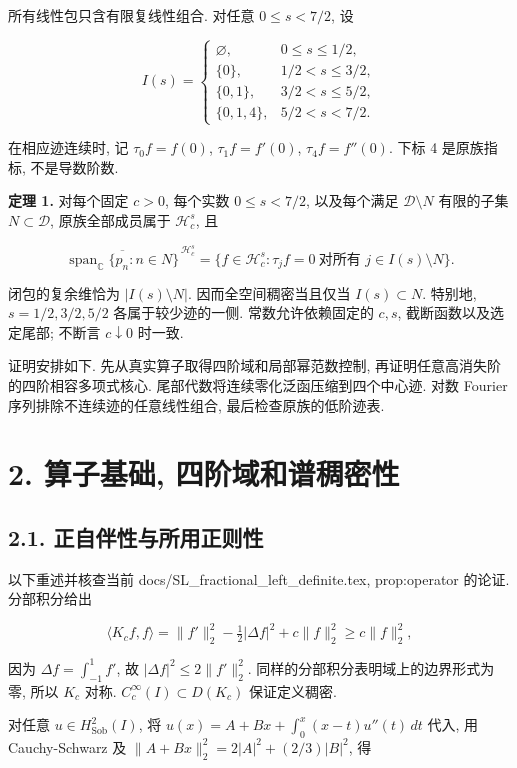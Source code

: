 \documentclass[UTF8,fontset=fandol,11pt,a4paper]{ctexart}
\begin{document}
所有线性包只含有限复线性组合. 对任意 \(0\le s<7/2\), 设


\[
 I(s)=
 \begin{cases}
 \varnothing,&0\le s\le1/2,\\
 \{0\},&1/2<s\le3/2,\\
 \{0,1\},&3/2<s\le5/2,\\
 \{0,1,4\},&5/2<s<7/2.
 \end{cases}
 \tag{1.4}
\]


在相应迹连续时, 记 \(\tau_0 f=f(0)\), \(\tau_1 f=f'(0)\), \(\tau_4 f=f''(0)\). 下标 4 是原族指标, 不是导数阶数.


\textbf{定理 1.} 对每个固定 \(c>0\), 每个实数 \(0\le s<7/2\), 以及每个满足 \(\mathcal D\setminus N\) 有限的子集 \(N\subset\mathcal D\), 原族全部成员属于 \(\mathcal H_c^s\), 且


\[
 \boxed{
 \overline{\operatorname{span}_{\mathbb C}\{p_n:n\in N\}}^{\,\mathcal H_c^s}
 =
 \{f\in\mathcal H_c^s:\tau_j f=0\ \text{对所有 }j\in I(s)\setminus N\}.
 }
 \tag{1.5}
\]


闭包的复余维恰为 \(|I(s)\setminus N|\). 因而全空间稠密当且仅当 \(I(s)\subset N\). 特别地, \(s=1/2,3/2,5/2\) 各属于较少迹的一侧. 常数允许依赖固定的 \(c,s\), 截断函数以及选定尾部; 不断言 \(c\downarrow0\) 时一致.


证明安排如下. 先从真实算子取得四阶域和局部幂范数控制, 再证明任意高消失阶的四阶相容多项式核心. 尾部代数将连续零化泛函压缩到四个中心迹. 对数 Fourier 序列排除不连续迹的任意线性组合, 最后检查原族的低阶迹表.


\section*{2. 算子基础, 四阶域和谱稠密性}

\subsection*{2.1. 正自伴性与所用正则性}

以下重述并核查当前 docs/SL\_fractional\_left\_definite.tex, prop:operator 的论证. 分部积分给出


\[
 \langle K_cf,f\rangle
 =\|f'\|_2^2-\tfrac12|\Delta f|^2+c\|f\|_2^2
 \ge c\|f\|_2^2,
 \tag{2.1}
\]


因为 \(\Delta f=\int_{-1}^1 f'\), 故 \(|\Delta f|^2\le2\|f'\|_2^2\). 同样的分部积分表明域上的边界形式为零, 所以 \(K_c\) 对称. \(C_c^\infty(I)\subset D(K_c)\) 保证定义稠密.


对任意 \(u\in H_{\mathrm{Sob}}^2(I)\), 将
\(u(x)=A+Bx+\int_0^x(x-t)u''(t)\,dt\)
代入, 用 Cauchy-Schwarz 及
\(\|A+Bx\|_2^2=2|A|^2+(2/3)|B|^2\), 得
\end{document}
